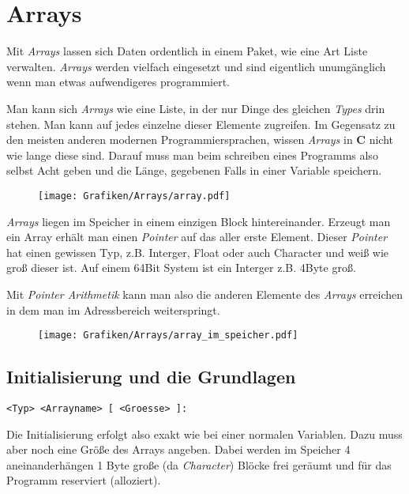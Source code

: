 \documentclass[c_worksheet.tex]{subfiles}
\begin{document}
	
\chapter{Arrays} 

Mit \emph{Arrays} lassen sich Daten ordentlich in einem Paket, wie eine Art Liste verwalten. \emph{Arrays} werden vielfach eingesetzt und sind eigentlich unumgänglich wenn man etwas aufwendigeres programmiert.

Man kann sich \emph{Arrays} wie eine Liste, in der nur Dinge des gleichen \emph{Types} drin stehen. Man kann auf jedes einzelne dieser Elemente zugreifen. Im Gegensatz zu den meisten anderen modernen Programmiersprachen, wissen \emph{Arrays} in \textbf{C} nicht wie lange diese sind. Darauf muss man beim schreiben eines Programms also selbst Acht geben und die Länge, gegebenen Falls in einer Variable speichern.

\begin{figure}[h]
\center
\texttt{[image: Grafiken/Arrays/array.pdf]} 
\end{figure}

\emph{Arrays} liegen im Speicher in einem einzigen Block hintereinander. Erzeugt man ein Array erhält man einen \emph{Pointer} auf das aller erste Element. Dieser \emph{Pointer} hat einen gewissen Typ, z.B. Interger, Float oder auch Character und weiß wie groß dieser ist. Auf einem 64Bit System ist ein Interger z.B. 4Byte groß.

Mit \emph{Pointer Arithmetik} kann man also die anderen Elemente des \emph{Arrays} erreichen in dem man im Adressbereich weiterspringt.

\begin{figure}[h]
\center	
\texttt{[image: Grafiken/Arrays/array\_im\_speicher.pdf]} 
\end{figure}

\section{Initialisierung und die Grundlagen} 

\begin{lstlisting}
<Typ> <Arrayname> [ <Groesse> ]:
\end{lstlisting}

Die Initialisierung erfolgt also exakt wie bei einer normalen Variablen. Dazu muss aber noch eine Größe des Arrays angeben. Dabei werden im Speicher 4 aneinanderhängen 1 Byte große (da \emph{Character}) Blöcke frei geräumt und für das Programm reserviert (alloziert).
\end{document}
